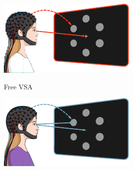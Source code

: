 \documentclass{kul-ulille-beamer}
\begin{document}
\begin{frame}
\begin{minipage}{.6\textwidth}
{\begin{minipage}{.3\textwidth}
      \includegraphics[width=\textwidth]{figures/covert/attention_covert.pdf}
    \end{minipage}\hfill%
    \begin{minipage}{.3\textwidth}
      \small
      Free VSA
      \smallskip

      \includegraphics[width=\textwidth]{figures/covert/attention_free.pdf}
    \end{minipage}%
  }
  \end{minipage}



\end{frame}
\end{document}
